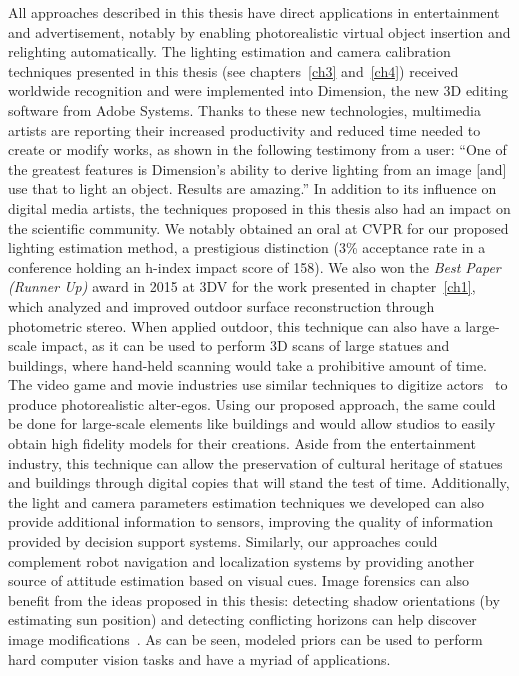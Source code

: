 All approaches described in this thesis have direct applications in entertainment and advertisement, notably by enabling photorealistic virtual object insertion and relighting automatically. The lighting estimation and camera calibration techniques presented in this thesis (see chapters~\ref{ch3} and~\ref{ch4}) received worldwide recognition and were implemented into Dimension, the new 3D editing software from Adobe Systems. Thanks to these new technologies, multimedia artists are reporting their increased productivity and reduced time needed to create or modify works, as shown in the following testimony from a user: ``One of the greatest features is Dimension's ability to derive lighting from an image [and] use that to light an object. Results are amazing.'' In addition to its influence on digital media artists, the techniques proposed in this thesis also had an impact on the scientific community. We notably obtained an oral at CVPR for our proposed lighting estimation method, a prestigious distinction (3\% acceptance rate in a conference holding an h-index impact score of 158). We also won the \emph{Best Paper (Runner Up)} award in 2015 at 3DV for the work presented in chapter~\ref{ch1}, which analyzed and improved outdoor surface reconstruction through photometric stereo. When applied outdoor, this technique can also have a large-scale impact, as it can be used to perform 3D scans of large statues and buildings, where hand-held scanning would take a prohibitive amount of time. The video game and movie industries use similar techniques to digitize actors~\cite{debevec2000acquiring} to produce photorealistic alter-egos. Using our proposed approach, the same could be done for large-scale elements like buildings and would allow studios to easily obtain high fidelity models for their creations. Aside from the entertainment industry, this technique can allow the preservation of cultural heritage of statues and buildings through digital copies that will stand the test of time. Additionally, the light and camera parameters estimation techniques we developed can also provide additional information to sensors, improving the quality of information provided by decision support systems. Similarly, our approaches could complement robot navigation and localization systems by providing another source of attitude estimation based on visual cues. Image forensics can also benefit from the ideas proposed in this thesis: detecting shadow orientations (by estimating sun position) and detecting conflicting horizons can help discover image modifications~\cite{Farid2010}. As can be seen, modeled priors can be used to perform hard computer vision tasks and have a myriad of applications.

